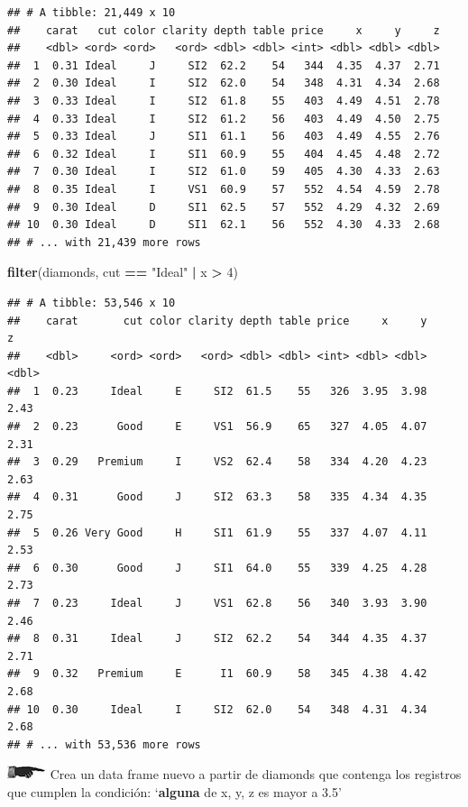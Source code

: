 \documentclass[]{book}
\newenvironment{Shaded}{\begin{snugshade}}{\end{snugshade}}
\newcommand{\KeywordTok}[1]{\textcolor[rgb]{0.13,0.29,0.53}{\textbf{#1}}}
\newcommand{\DecValTok}[1]{\textcolor[rgb]{0.00,0.00,0.81}{#1}}
\newcommand{\StringTok}[1]{\textcolor[rgb]{0.31,0.60,0.02}{#1}}
\newcommand{\OperatorTok}[1]{\textcolor[rgb]{0.81,0.36,0.00}{\textbf{#1}}}
\newcommand{\NormalTok}[1]{#1}
\theoremstyle{definition}
\theoremstyle{definition}
\theoremstyle{definition}
\theoremstyle{remark}
\begin{document}
\begin{verbatim}
## # A tibble: 21,449 x 10
##    carat   cut color clarity depth table price     x     y     z
##    <dbl> <ord> <ord>   <ord> <dbl> <dbl> <int> <dbl> <dbl> <dbl>
##  1  0.31 Ideal     J     SI2  62.2    54   344  4.35  4.37  2.71
##  2  0.30 Ideal     I     SI2  62.0    54   348  4.31  4.34  2.68
##  3  0.33 Ideal     I     SI2  61.8    55   403  4.49  4.51  2.78
##  4  0.33 Ideal     I     SI2  61.2    56   403  4.49  4.50  2.75
##  5  0.33 Ideal     J     SI1  61.1    56   403  4.49  4.55  2.76
##  6  0.32 Ideal     I     SI1  60.9    55   404  4.45  4.48  2.72
##  7  0.30 Ideal     I     SI2  61.0    59   405  4.30  4.33  2.63
##  8  0.35 Ideal     I     VS1  60.9    57   552  4.54  4.59  2.78
##  9  0.30 Ideal     D     SI1  62.5    57   552  4.29  4.32  2.69
## 10  0.30 Ideal     D     SI1  62.1    56   552  4.30  4.33  2.68
## # ... with 21,439 more rows
\end{verbatim}

\begin{Shaded}
\begin{Highlighting}[]
\KeywordTok{filter}\NormalTok{(diamonds, cut }\OperatorTok{==}\StringTok{ "Ideal"} \OperatorTok{|}\StringTok{ }\NormalTok{x }\OperatorTok{>}\StringTok{ }\DecValTok{4}\NormalTok{)}
\end{Highlighting}
\end{Shaded}

\begin{verbatim}
## # A tibble: 53,546 x 10
##    carat       cut color clarity depth table price     x     y     z
##    <dbl>     <ord> <ord>   <ord> <dbl> <dbl> <int> <dbl> <dbl> <dbl>
##  1  0.23     Ideal     E     SI2  61.5    55   326  3.95  3.98  2.43
##  2  0.23      Good     E     VS1  56.9    65   327  4.05  4.07  2.31
##  3  0.29   Premium     I     VS2  62.4    58   334  4.20  4.23  2.63
##  4  0.31      Good     J     SI2  63.3    58   335  4.34  4.35  2.75
##  5  0.26 Very Good     H     SI1  61.9    55   337  4.07  4.11  2.53
##  6  0.30      Good     J     SI1  64.0    55   339  4.25  4.28  2.73
##  7  0.23     Ideal     J     VS1  62.8    56   340  3.93  3.90  2.46
##  8  0.31     Ideal     J     SI2  62.2    54   344  4.35  4.37  2.71
##  9  0.32   Premium     E      I1  60.9    58   345  4.38  4.42  2.68
## 10  0.30     Ideal     I     SI2  62.0    54   348  4.31  4.34  2.68
## # ... with 53,536 more rows
\end{verbatim}

\includegraphics{./imagenes/manicule2.jpg} Crea un data frame nuevo a
partir de diamonds que contenga los registros que cumplen la condición:
`\textbf{alguna} de x, y, z es mayor a 3.5'
\end{document}
